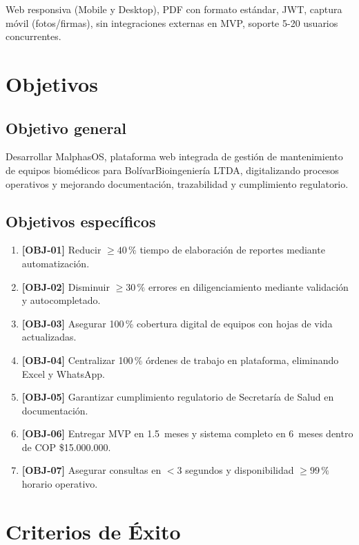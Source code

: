 \documentclass[12pt,a4paper]{article}
\begin{document}
Web responsiva (Mobile y Desktop), PDF con formato estándar, JWT, captura móvil (fotos/firmas), sin integraciones externas en MVP, soporte 5-20 usuarios concurrentes.

\section{Objetivos}

\subsection{Objetivo general}

Desarrollar MalphasOS, plataforma web integrada de gestión de mantenimiento de equipos biomédicos para BolívarBioingeniería LTDA, digitalizando procesos operativos y mejorando documentación, trazabilidad y cumplimiento regulatorio.

\subsection{Objetivos específicos}

\begin{enumerate}
  \item \textbf{[OBJ-01]} Reducir $\geq 40\,\%$ tiempo de elaboración de reportes mediante automatización.
  \item \textbf{[OBJ-02]} Disminuir $\geq 30\,\%$ errores en diligenciamiento mediante validación y autocompletado.
  \item \textbf{[OBJ-03]} Asegurar 100\,\% cobertura digital de equipos con hojas de vida actualizadas.
  \item \textbf{[OBJ-04]} Centralizar 100\,\% órdenes de trabajo en plataforma, eliminando Excel y WhatsApp.
  \item \textbf{[OBJ-05]} Garantizar cumplimiento regulatorio de Secretaría de Salud en documentación.
  \item \textbf{[OBJ-06]} Entregar MVP en 1.5~meses y sistema completo en 6~meses dentro de COP \$15.000.000.
  \item \textbf{[OBJ-07]} Asegurar consultas en $< 3$ segundos y disponibilidad $\geq 99\,\%$ horario operativo.
\end{enumerate}

\section{Criterios de Éxito}
\end{document}
